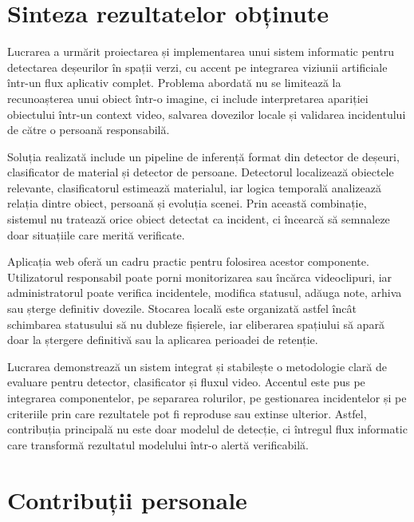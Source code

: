 
\section*{Sinteza rezultatelor obținute}
{}

Lucrarea a urmărit proiectarea și implementarea unui sistem informatic pentru detectarea deșeurilor în spații verzi, cu accent pe integrarea viziunii artificiale într-un flux aplicativ complet. Problema abordată nu se limitează la recunoașterea unui obiect într-o imagine, ci include interpretarea apariției obiectului într-un context video, salvarea dovezilor locale și validarea incidentului de către o persoană responsabilă.

Soluția realizată include un pipeline de inferență format din detector de deșeuri, clasificator de material și detector de persoane. Detectorul localizează obiectele relevante, clasificatorul estimează materialul, iar logica temporală analizează relația dintre obiect, persoană și evoluția scenei. Prin această combinație, sistemul nu tratează orice obiect detectat ca incident, ci încearcă să semnaleze doar situațiile care merită verificate.

Aplicația web oferă un cadru practic pentru folosirea acestor componente. Utilizatorul responsabil poate porni monitorizarea sau încărca videoclipuri, iar administratorul poate verifica incidentele, modifica statusul, adăuga note, arhiva sau șterge definitiv dovezile. Stocarea locală este organizată astfel încât schimbarea statusului să nu dubleze fișierele, iar eliberarea spațiului să apară doar la ștergere definitivă sau la aplicarea perioadei de retenție.

Lucrarea demonstrează un sistem integrat și stabilește o metodologie clară de evaluare pentru detector, clasificator și fluxul video. Accentul este pus pe integrarea componentelor, pe separarea rolurilor, pe gestionarea incidentelor și pe criteriile prin care rezultatele pot fi reproduse sau extinse ulterior. Astfel, contribuția principală nu este doar modelul de detecție, ci întregul flux informatic care transformă rezultatul modelului într-o alertă verificabilă.

\section*{Contribuții personale}
{}

